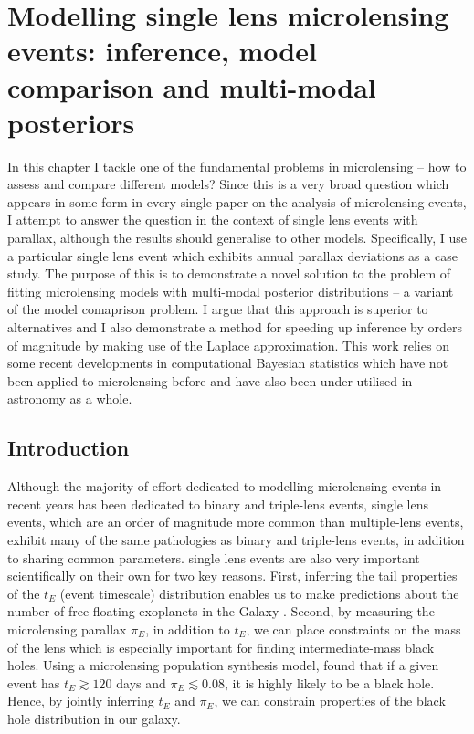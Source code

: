 \documentclass[12pt,dvipsnames]{report}
\begin{document}
\chapter{Modelling single lens microlensing events: inference, model comparison and 
multi-modal posteriors}
\label{ch:single_lens_models}
In this chapter I tackle one of the fundamental problems in microlensing -- how to 
assess and compare different models? Since this is a very broad question which appears
in some form in every single paper on the analysis of microlensing events, I attempt to 
answer the question in the context of single lens events with parallax, although 
the results should generalise to other models. Specifically, I use a particular single lens 
event which exhibits annual parallax deviations as a case study. The purpose of this 
is to demonstrate a novel solution to the problem of fitting microlensing models with multi-modal 
posterior distributions -- a variant of the model comaprison problem. 
I argue that this approach is superior to alternatives and 
I also demonstrate a method for speeding up inference by orders of 
magnitude by making use of the Laplace approximation. This work relies on some recent 
developments in computational Bayesian statistics which have not been applied to 
microlensing before and have also been under-utilised in astronomy as a whole.

\section{Introduction}
Although the majority of effort dedicated to modelling microlensing events in recent 
years has been dedicated to binary and triple-lens events, single lens events, which are
an order of magnitude more common than multiple-lens events, exhibit many of the same 
pathologies as binary and triple-lens events, in addition to  
sharing common parameters. single lens events are also very important scientifically 
on their own for two key reasons. First, inferring the tail properties of the $t_E$ (event 
timescale)
distribution enables us to make predictions about the number of free-floating exoplanets
in the Galaxy \citep{sumi_unbound_2011,mroz_no_2017}. Second, by measuring the microlensing 
parallax $\pi_E$, in addition to $t_E$, we can place constraints on the mass of the 
lens \citep{2016MNRAS.458.3012W} which is especially important for finding intermediate-mass 
black holes.  Using a microlensing population synthesis model, \citet{2020ApJ...889...31L} 
found that if a given event has $t_E\gtrsim 120$ days and 
$\pi_E\lesssim 0.08$, it is highly likely to be a black hole. Hence, by jointly inferring 
$t_E$ and $\pi_E$, we can constrain properties of the black hole distribution in our 
galaxy.
\end{document}
